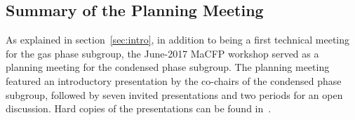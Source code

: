 
\subsection{Summary of the Planning Meeting} \label{sec:CPS_session_2}

As explained in section~\ref{sec:intro}, in addition to being a first technical meeting for the gas phase subgroup, the June-2017 MaCFP workshop served as a planning meeting for the condensed phase subgroup. The planning meeting featured an introductory presentation by the co-chairs of the condensed phase subgroup, followed by seven invited presentations and two periods for an open discussion. Hard copies of the presentations can be found in~\cite{MaCFP_wks_presentations}.

